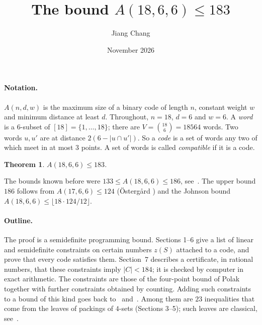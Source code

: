 \documentclass[11pt,a4paper]{article}
\title{\large\bfseries The bound $A(18,6,6)\le 183$}
\author{Jiang Chang}
\date{November 2026}
\newtheorem*{theorem}{Theorem}
\newcommand{\abs}[1]{\lvert #1\rvert}
\begin{document}
\maketitle

\paragraph{Notation.}
$A(n,d,w)$ is the maximum size of a binary code of length $n$, constant
weight $w$ and minimum distance at least $d$. Throughout, $n=18$, $d=6$ and
$w=6$. A \emph{word} is a $6$-subset of $[18]=\{1,\dots,18\}$; there are
$V=\binom{18}6=18564$ words. Two words $u,u'$ are at distance
$2(6-\abs{u\cap u'})$. So a \emph{code} is a set of words any two of which
meet in at most $3$ points. A set of words is called \emph{compatible} if it
is a code.

\begin{theorem}
$A(18,6,6)\le 183$.
\end{theorem}

The bounds known before were $133\le A(18,6,6)\le 186$, see~\cite{Btab}.
The upper bound $186$ follows from $A(17,6,6)\le 124$ (\"Osterg{\aa}rd
\cite{Ost}) and the Johnson bound $A(18,6,6)\le\lfloor 18\cdot 124/12\rfloor$.

\paragraph{Outline.}
The proof is a semidefinite programming bound. Sections 1--6 give a list of
linear and semidefinite constraints on certain numbers $z(S)$ attached to a
code, and prove that every code satisfies them. Section~7 describes a
certificate, in rational numbers, that these constraints imply $\abs C<184$;
it is checked by computer in exact arithmetic. The constraints are those of
the four-point bound of Polak~\cite{Polak} together with further
constraints obtained by counting. Adding such constraints to a bound of
this kind goes back to~\cite{BB} and~\cite[Theorem 22]{BBMOS}. Among them
are $23$ inequalities that come from the leaves of packings of $4$-sets
(Sections 3--5); such leaves are classical, see~\cite{B79}.
\end{document}
